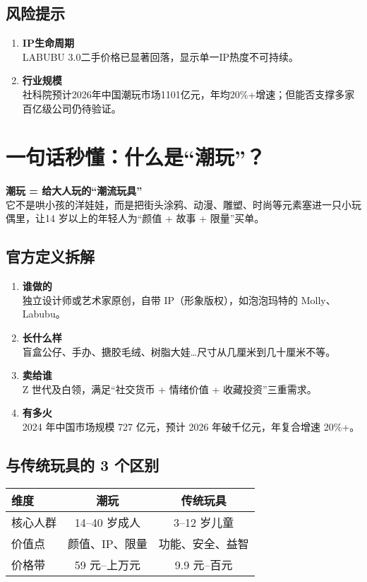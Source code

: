 \subsection{风险提示}
\begin{enumerate}[leftmargin=*, nosep]
    \item \textbf{IP生命周期}  \\
    LABUBU 3.0二手价格已显著回落，显示单一IP热度不可持续。
    \item \textbf{行业规模}  \\
    社科院预计2026年中国潮玩市场1101亿元，年均20\%+增速；但能否支撑多家百亿级公司仍待验证。
\end{enumerate}

\section{一句话秒懂：什么是“潮玩”？}
\textbf{潮玩 = 给大人玩的“潮流玩具”}  \\
它不是哄小孩的洋娃娃，而是把街头涂鸦、动漫、雕塑、时尚等元素塞进一只小玩偶里，让14 岁以上的年轻人为“颜值 + 故事 + 限量”买单。

\subsection{官方定义拆解}
\begin{enumerate}[leftmargin=*, nosep]
    \item \textbf{谁做的}  \\
    独立设计师或艺术家原创，自带 IP（形象版权），如泡泡玛特的 Molly、Labubu。
    
    \item \textbf {长什么样}  \\
    盲盒公仔、手办、搪胶毛绒、树脂大娃…尺寸从几厘米到几十厘米不等。
    
    \item \textbf {卖给谁 }\\ 
    Z 世代及白领，满足“社交货币 + 情绪价值 + 收藏投资”三重需求。
    
    \item \textbf {有多火}\\  
    2024 年中国市场规模 727 亿元，预计 2026 年破千亿元，年复合增速 20\%+。
\end{enumerate}

\subsection{与传统玩具的 3 个区别}
\begin{table}[H]
\centering
\begin{tabular}{lcc}
\toprule
维度 & 潮玩 & 传统玩具 \\
\midrule
核心人群 & 14–40 岁成人 & 3–12 岁儿童 \\
价值点 & 颜值、IP、限量 & 功能、安全、益智 \\
价格带 & 59 元–上万元 & 9.9 元–百元 \\
\bottomrule
\end{tabular}
\end{table}

